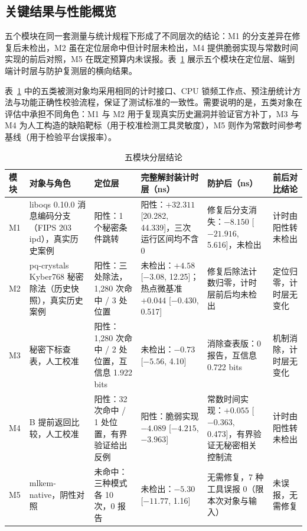 \subsection{关键结果与性能概览}

五个模块在同一套测量与统计规程下形成了不同层次的结论：M1 的分支差异在修复后未检出，M2 虽在定位层命中但计时层未检出，M4 提供脆弱实现与常数时间实现的前后对照，M5 在既定预算内未误报。表~\ref{tab:modules} 展示五个模块在定位层、端到端计时层与防护复测层的横向结果。

表~\ref{tab:modules} 中的五类被测对象均采用相同的计时接口、CPU 锁频工作点、预注册统计方法与功能正确性校验流程，保证了测试标准的一致性。需要说明的是，五类对象在评估中承担不同角色：M1 与 M2 用于复现真实历史漏洞并验证官方补丁，M3 与 M4 为人工构造的缺陷靶标（用于校准检测工具灵敏度），M5 则作为常数时间参考基线（用于检验平台误报率）。

\begin{table}[H]
\centering
\caption{五模块分层结论}
\label{tab:modules}
{\footnotesize
\begin{tabularx}{\textwidth}{|>{\raggedright\arraybackslash}p{0.8cm}|>{\raggedright\arraybackslash}p{3.6cm}|>{\raggedright\arraybackslash}p{2.7cm}|>{\raggedright\arraybackslash}p{3.1cm}|>{\raggedright\arraybackslash}p{2.9cm}|>{\raggedright\arraybackslash}X|}
\hline
模块 & 对象与角色 & 定位层 & 完整解封装计时层（ns） & 防护后（ns） & 前后对比结论 \\
\hline
M1 & liboqs 0.10.0 消息编码分支（FIPS 203 ipd），真实历史案例 & 阳性：1 个秘密条件跳转 & 阳性：$+32.311$ [20.282, 44.339]，三次运行区间均不含 0 & 修复后分支消失：$-8.150$ [$-21.916$, 5.616]，未检出 & 计时由阳性转未检出 \\
\hline
M2 & pq-crystals Kyber768 秘密除法（历史快照），真实历史案例 & 阳性：三处除法，1,280 次命中 / 3 处位置 & 未检出：$+4.58$ [$-3.08$, 12.25]；热点微基准 $+0.044$ [$-0.430$, 0.517] & 修复后除法计数归零，计时层前后均未检出 & 定位归零，计时层无变化 \\
\hline
M3 & 秘密下标查表，人工校准 & 阳性：1,280 次命中 / 2 处位置，互信息 1.922 bits & 未检出：$-0.73$ [$-5.56$, 4.10] & 消除查表版：0 报告，互信息 0.722 bits & 机制消除，计时层无变化 \\
\hline
M4 & 32 B 提前返回比较，人工校准 & 阳性：32 次命中 / 1 处位置，有界验证给出反例 & 阳性：脆弱实现 $-4.089$ [$-4.215$, $-3.963$] & 常数时间实现：$+0.055$ [$-0.363$, 0.473]，有界验证无秘密相关控制流 & 计时由阳性转未检出 \\
\hline
M5 & mlkem-native，阴性对照 & 未命中：三种模式各 10 次，0 报告 & 未检出：$-5.30$ [$-11.77$, 1.16] & 无需修复，7 种工具误报 0（限本次对象与输入） & 未误报，无需修复 \\
\hline
\end{tabularx}
}
\end{table}

